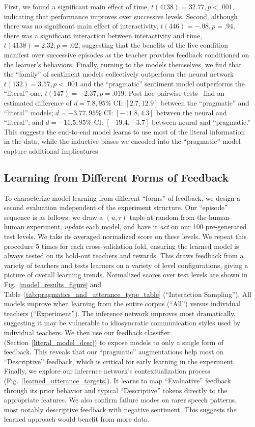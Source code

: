 \documentclass[letterpaper]{article} %
\begin{document}
First, we found a significant main effect of time, $t(4138)=32.77, p<.001$, indicating that performance improves over successive levels.
Second, although there was no significant main effect of interactivity, $t(446)=-.08, p=.94$, there was a significant interaction between  interactivity and time, $t(4138)=2.32, p=.02$, suggesting that the benefits of the live condition manifest over successive episodes as the teacher provides feedback conditioned on the learner's behaviors.
Finally, turning to the models themselves, we find that the ``family'' of sentiment models collectively outperform the neural network $t(132)=3.57, p<.001$ and the ``pragmatic'' sentiment model outperforms the ``literal'' one, $t(147)=-2.37, p=.019$.
Post-hoc pairwise tests~\cite{tukey1953section} find an estimated difference of $d = 7.8, 95\%$ CI: $[2.7, 12.9]$ between the ``pragmatic'' and ``literal'' models; $d = -3.77, 95\%$ CI: $[-11.8, 4.3]$ between the neural and ``literal''; and $d = -11.5, 95\%$ CI: $[-19.4, -3.7]$ between neural and ``pragmatic.''
This suggests the end-to-end model learns to use most of the literal information in the data, while the inductive biases we encoded into the ``pragmatic'' model capture additional implicatures.
\subsection{Learning from Different Forms of Feedback}
\label{random_sample_interactions}
\label{feedback_types}
To characterize model learning from different ``forms'' of feedback, we design a second evaluation independent of the experiment structure. Our ``episode'' sequence is as follows: we draw a $(u, \tau)$ tuple at random from the human-human experiment, \emph{update} each model, and have it \emph{act} on our 100 pre-generated test levels. We take its averaged normalized score on these levels. We repeat this procedure 5 times for each cross-validation fold, ensuring the learned model is always tested on its hold-out teachers and rewards. This draws feedback from a variety of teachers and tests learners on a variety of level configurations, giving a picture of overall learning trends. Normalized scores over test levels are shown in Fig.~\ref{model_results_figure} and Table~\ref{tab:pragmatics_and_utterance_type_table} (``Interaction Sampling''). All models improve when learning from the entire corpus (``All'') versus individual teachers (``Experiment''). The inference network improves most dramatically, suggesting it may be vulnerable to idiosyncratic communication styles used by individual teachers. We then use our feedback classifier (Section~\ref{literal_model_desc}) to expose models to only a single form of feedback. This reveals that our ``pragmatic'' augmentations help most on ``Descriptive'' feedback, which is critical for early learning in the experiment. Finally, we explore our inference network's contextualization process (Fig.~\ref{learned_utterance_targets}). It learns to map ``Evaluative'' feedback through its prior behavior and typical ``Descriptive'' tokens directly to the appropriate features. We also confirm failure modes on rarer speech patterns, most notably descriptive feedback with negative sentiment. This suggests the learned approach would benefit from more data.
\end{document}

